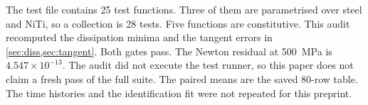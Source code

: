 \documentclass[10pt,a4paper]{article}
\begin{document}
The test file contains 25 test functions. Three of them are parametrised over steel and NiTi, so a collection is 28 tests. Five functions are constitutive. This audit recomputed the dissipation minima and the tangent errors in \cref{sec:diss,sec:tangent}. Both gates pass. The Newton residual at 500~MPa is $4.547\times 10^{-13}$. The audit did not execute the test runner, so this paper does not claim a fresh pass of the full suite. The paired means are the saved 80-row table. The time histories and the identification fit were not repeated for this preprint.



\end{document}
